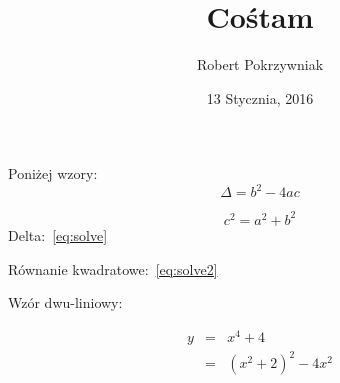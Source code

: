 \documentclass[11pt]{article}
\title{Cośtam}
\author{Robert Pokrzywniak}
\date{13 Stycznia, 2016}
\begin{document}
\maketitle
 
\begin{center}Poniżej wzory:
\begin{equation} \label{eq:solve}
\Delta = b^{2}-4ac
\end{equation}
 
\begin{equation} \label{eq:solve2}
c^{2} = a^{2}+b^{2}
\end{equation}
Delta:~\ref{eq:solve}
 
Równanie kwadratowe:~\ref{eq:solve2}
 
\centerline{Wzór dwu-liniowy:}
\begin{eqnarray*}
 y &=& x^4 + 4      \nonumber \\
   &=& (x^2+2)^2 -4x^2 \nonumber \\
\end{eqnarray*}
 

\end{center}
\end{document}
